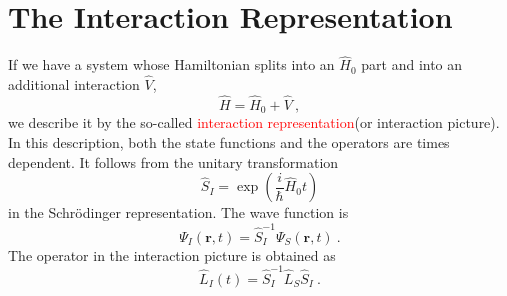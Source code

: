 \documentclass[11pt,a4paper]{article}
\renewcommand{\vec}[1]{\boldsymbol{#1}}
\begin{document}
\section{The Interaction Representation}
If we have a system whose Hamiltonian splits into an $\widehat{H}_0$ part and into an additional interaction $\widehat{V}$, 
\begin{equation}
\widehat{H} = \widehat{H}_0 +\widehat{V} ~,
\end{equation}
we describe it by the so-called \textcolor{red}{interaction representation}(or interaction picture). In this description, both the state functions and the operators are times dependent. It follows from the unitary transformation
\begin{equation}
\widehat{S}_I = \exp \left(\dfrac{i}{\hbar} \widehat{H}_0 t \right)
\end{equation}
in the Schr\"odinger representation. The wave function is
\begin{equation}
\Psi_I(\vec{r}, t) = \widehat{S}_I^{-1} \Psi_S(\vec{r}, t) ~.
\end{equation}
The operator in the interaction picture is obtained as
\begin{equation}
\widehat{L}_I(t) = \widehat{S}_I^{-1} \widehat{L}_S \widehat{S}_I ~.
\end{equation}









\end{document}
